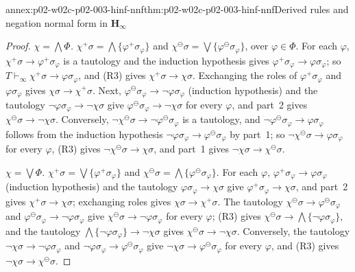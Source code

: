 \begin{annexitem}{annex:p02-w02c-p02-003-hinf-nnf}{thm:p02-w02c-p02-003-hinf-nnf}{Derived rules and negation normal form in \(\mathbf H_{\infty}\)}
\begin{proof}
\emph{\(\chi=\bigwedge\Phi\).}  \(\chi^{+}\sigma=\bigwedge\{\varphi^{+}
\sigma_\varphi\}\) and \(\chi^{\ominus}\sigma=\bigvee\{\varphi^{\ominus}
\sigma_\varphi\}\), over \(\varphi\in\Phi\).  For each \(\varphi\),
\(\chi^{+}\sigma\to\varphi^{+}\sigma_\varphi\) is a tautology and the
induction hypothesis gives \(\varphi^{+}\sigma_\varphi\to\varphi\sigma_\varphi\);
so \(T\vdash_{\infty}\chi^{+}\sigma\to\varphi\sigma_\varphi\), and (R3) gives
\(\chi^{+}\sigma\to\chi\sigma\).  Exchanging the roles of \(\varphi^{+}
\sigma_\varphi\) and \(\varphi\sigma_\varphi\) gives \(\chi\sigma\to
\chi^{+}\sigma\).  Next, \(\varphi^{\ominus}\sigma_\varphi\to\neg\varphi
\sigma_\varphi\) (induction hypothesis) and the tautology
\(\neg\varphi\sigma_\varphi\to\neg\chi\sigma\) give
\(\varphi^{\ominus}\sigma_\varphi\to\neg\chi\sigma\) for every \(\varphi\),
and part~2 gives \(\chi^{\ominus}\sigma\to\neg\chi\sigma\).  Conversely,
\(\neg\chi^{\ominus}\sigma\to\neg\varphi^{\ominus}\sigma_\varphi\) is a
tautology, and \(\neg\varphi^{\ominus}\sigma_\varphi\to\varphi\sigma_\varphi\)
follows from the induction hypothesis \(\neg\varphi\sigma_\varphi\to
\varphi^{\ominus}\sigma_\varphi\) by part~1; so
\(\neg\chi^{\ominus}\sigma\to\varphi\sigma_\varphi\) for every \(\varphi\),
(R3) gives \(\neg\chi^{\ominus}\sigma\to\chi\sigma\), and part~1 gives
\(\neg\chi\sigma\to\chi^{\ominus}\sigma\).

\emph{\(\chi=\bigvee\Phi\).}  \(\chi^{+}\sigma=\bigvee\{\varphi^{+}
\sigma_\varphi\}\) and \(\chi^{\ominus}\sigma=\bigwedge\{\varphi^{\ominus}
\sigma_\varphi\}\).  For each \(\varphi\), \(\varphi^{+}\sigma_\varphi\to
\varphi\sigma_\varphi\) (induction hypothesis) and the tautology
\(\varphi\sigma_\varphi\to\chi\sigma\) give \(\varphi^{+}\sigma_\varphi\to
\chi\sigma\), and part~2 gives \(\chi^{+}\sigma\to\chi\sigma\); exchanging
roles gives \(\chi\sigma\to\chi^{+}\sigma\).  The tautology
\(\chi^{\ominus}\sigma\to\varphi^{\ominus}\sigma_\varphi\) and
\(\varphi^{\ominus}\sigma_\varphi\to\neg\varphi\sigma_\varphi\) give
\(\chi^{\ominus}\sigma\to\neg\varphi\sigma_\varphi\) for every \(\varphi\);
(R3) gives \(\chi^{\ominus}\sigma\to\bigwedge\{\neg\varphi\sigma_\varphi\}\),
and the tautology \(\bigwedge\{\neg\varphi\sigma_\varphi\}\to\neg\chi\sigma\)
gives \(\chi^{\ominus}\sigma\to\neg\chi\sigma\).  Conversely, the tautology
\(\neg\chi\sigma\to\neg\varphi\sigma_\varphi\) and
\(\neg\varphi\sigma_\varphi\to\varphi^{\ominus}\sigma_\varphi\) give
\(\neg\chi\sigma\to\varphi^{\ominus}\sigma_\varphi\) for every \(\varphi\),
and (R3) gives \(\neg\chi\sigma\to\chi^{\ominus}\sigma\).


\end{proof}
\end{annexitem}
